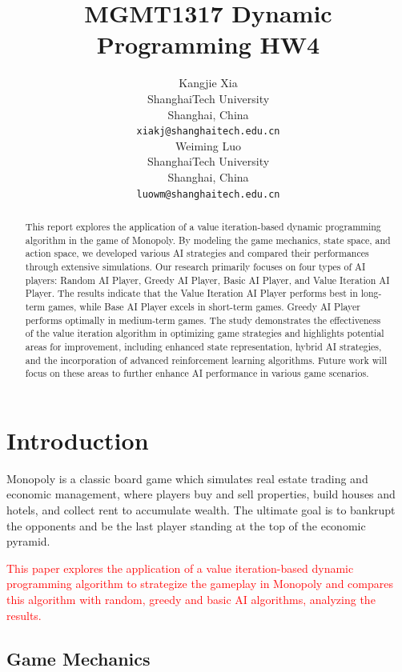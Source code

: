 \documentclass{article}
\title{MGMT1317 Dynamic Programming HW4}
\author{Kangjie Xia\\
    ShanghaiTech University\\
    Shanghai, China \\
    \texttt{xiakj@shanghaitech.edu.cn} \\
    \And Weiming Luo\\
    ShanghaiTech University\\
    Shanghai, China \\
    \texttt{luowm@shanghaitech.edu.cn} \\
}
\begin{document}
\maketitle

\begin{abstract}
This report explores the application of a value iteration-based dynamic programming algorithm in the game of Monopoly. By modeling the game mechanics, state space, and action space, we developed various AI strategies and compared their performances through extensive simulations. Our research primarily focuses on four types of AI players: Random AI Player, Greedy AI Player, Basic AI Player, and Value Iteration AI Player. The results indicate that the Value Iteration AI Player performs best in long-term games, while Base AI Player excels in short-term games. Greedy AI Player performs optimally in medium-term games. The study demonstrates the effectiveness of the value iteration algorithm in optimizing game strategies and highlights potential areas for improvement, including enhanced state representation, hybrid AI strategies, and the incorporation of advanced reinforcement learning algorithms. Future work will focus on these areas to further enhance AI performance in various game scenarios.
\end{abstract}

\newpage

\section{Introduction}
Monopoly is a classic board game which simulates real estate trading and economic management, where players buy and sell properties, build houses and hotels, and collect rent to accumulate wealth. The ultimate goal is to bankrupt the opponents and be the last player standing at the top of the economic pyramid. 

\textcolor{red}{This paper explores the application of a value iteration-based dynamic programming algorithm to strategize the gameplay in Monopoly and compares this algorithm with random, greedy and basic AI algorithms, analyzing the results.}

    \subsection{Game Mechanics}    
    
\end{document}
